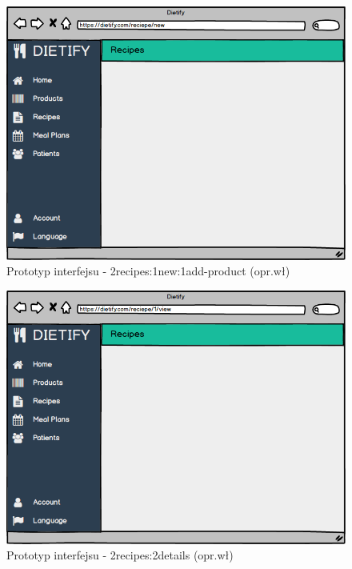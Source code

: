 \begin{minipage}{\textwidth}
    \begin{figure}[H]
        \centering\includegraphics[scale=0.55]{../mockup/2recipes_1new_1add-product.png}
        \caption{Prototyp interfejsu - 2recipes:1new:1add-product (opr.wł)}\label{rysunek:2recipes_1new_1add-product}
    \end{figure}
\end{minipage}
\begin{minipage}{\textwidth}
    \begin{figure}[H]
        \centering\includegraphics[scale=0.55]{../mockup/2recipes_2details.png}
        \caption{Prototyp interfejsu - 2recipes:2details (opr.wł)}\label{rysunek:2recipes_2details}
    \end{figure}
\end{minipage}
